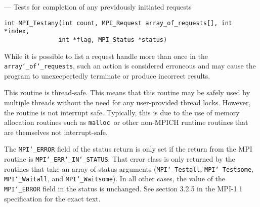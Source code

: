 \startmanpage
{}
--- Tests for completion of any previdously initiated  requests 
\startvb\begin{verbatim}
int MPI_Testany(int count, MPI_Request array_of_requests[], int *index, 
               int *flag, MPI_Status *status)

\end{verbatim}
\endvb

\par
{}
\par
{}
\par
While it is possible to list a request handle more than once in the
{\tt array{\tt \char`\_}of{\tt \char`\_}requests}, such an action is considered erroneous and may cause the
program to unexecpectedly terminate or produce incorrect results.
\par
{}
\par
This routine is thread-safe.  This means that this routine may be
safely used by multiple threads without the need for any user-provided
thread locks.  However, the routine is not interrupt safe.  Typically,
this is due to the use of memory allocation routines such as {\tt malloc
}or other non-MPICH runtime routines that are themselves not interrupt-safe.
\par
{}
\par
The {\tt MPI{\tt \char`\_}ERROR} field of the status return is only set if
the return from the MPI routine is {\tt MPI{\tt \char`\_}ERR{\tt \char`\_}IN{\tt \char`\_}STATUS}.  That error class
is only returned by the routines that take an array of status arguments
({\tt MPI{\tt \char`\_}Testall}, {\tt MPI{\tt \char`\_}Testsome}, {\tt MPI{\tt \char`\_}Waitall}, and {\tt MPI{\tt \char`\_}Waitsome}).  In
all other cases, the value of the {\tt MPI{\tt \char`\_}ERROR} field in the status is
unchanged.  See section 3.2.5 in the MPI-1.1 specification for the
exact text.
\par
